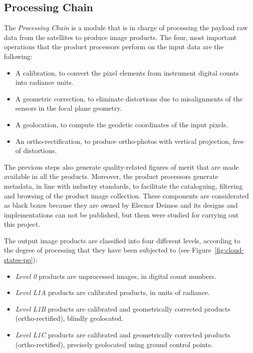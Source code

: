 \subsection{Processing Chain}


The \emph{Processing Chain} is a module that is in charge of processing the
payload raw data from the satellites to produce image products. The four, most
important operations that the product processors perform on the input data are
the following:
\begin{itemize}
\item A calibration, to convert the pixel elements from instrument digital counts into radiance units.
\item A geometric correction, to eliminate distortions due to misalignments of the sensors in the focal plane geometry.
\item A geolocation, to compute the geodetic coordinates of the input pixels.
\item An ortho-rectification, to produce ortho-photos with vertical projection, free of distortions.
\end{itemize}

The previous steps also generate quality-related figures of merit that are made
available in all the products. Moreover, the product processors generate
metadata, in line with industry standards, to facilitate the cataloguing,
filtering and browsing of the product image collection. These components are
considerated as black boxes because they are owned by Elecnor Deimos and its
designs and implementations can not be published, but them were studied for
carrying out this project.

The output image products are classified into four different levels, according to the degree of processing that they have been subjected to (see Figure~\ref{fig:cloud-states-pp}):
\begin{itemize}

\item \emph{Level 0} products are unprocessed images, in digital count numbers.
\item \emph{Level L1A} products are calibrated products, in units of radiance.
\item \emph{Level L1B} products are calibrated and geometrically corrected products (ortho-rectified), blindly geolocated.
\item \emph{Level L1C} products are calibrated and geometrically corrected products (ortho-rectified), precisely geolocated using ground control points.
\end{itemize}

